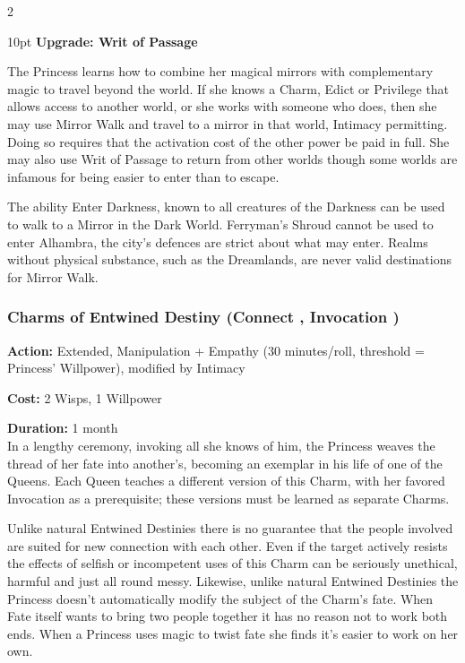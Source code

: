 \begin{multicols}{2}
\begin{myindentpar}{10pt}
\textbf{Upgrade: Writ of Passage}

The Princess learns how to combine her magical mirrors with complementary magic to travel beyond the world. If she knows a Charm, Edict or Privilege that allows access to another world, or she works with someone who does, then she may use Mirror Walk and travel to a mirror in that world, Intimacy permitting. Doing so requires that the activation cost of the other power be paid in full. She may also use Writ of Passage to return from other worlds \textendash though some worlds are infamous for being easier to enter than to escape. 

The ability Enter Darkness, known to all creatures of the Darkness can be used to walk to a Mirror in the Dark World. Ferryman's Shroud cannot be used to enter Alhambra, the city's defences are strict about what may enter. Realms without physical substance, such as the Dreamlands, are never valid destinations for Mirror Walk.

\end{myindentpar}

\subsubsection*{Charms of Entwined Destiny (Connect \textbullet\textbullet\textbullet\textbullet, Invocation \textbullet\textbullet\textbullet)}

\noindent \textbf{Action:} Extended, Manipulation + Empathy (30 minutes/roll, threshold = Princess' Willpower), modified by Intimacy

\noindent \textbf{Cost:} 2 Wisps, 1 Willpower

\noindent \textbf{Duration:} 1 month \\

\noindent In a lengthy ceremony, invoking all she knows of him, the Princess weaves the thread of her fate into another's, becoming an exemplar in his life of one of the Queens. Each Queen teaches a different version of this Charm, with her favored Invocation as a prerequisite; these versions must be learned as separate Charms.

Unlike natural Entwined Destinies there is no guarantee that the people involved are suited for new connection with each other. Even if the target actively resists the effects of selfish or incompetent uses of this Charm can be seriously unethical, harmful and just all round messy. Likewise, unlike natural Entwined Destinies the Princess doesn't automatically modify the subject of the Charm's fate. When Fate itself wants to bring two people together it has no reason not to work both ends. When a Princess uses magic to twist fate she finds it's easier to work on her own.


\end{multicols}
